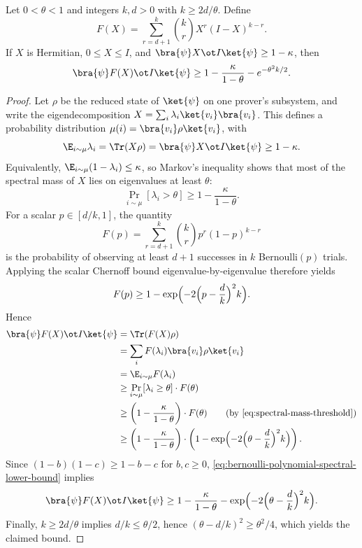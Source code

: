 \begin{lemma}\label{lem:chernoff-bernoulli-matrix}
	\leanok
	Let $0<\theta<1$ and integers $k,d>0$ with $k \ge 2d/\theta$. Define
	\[
		F(X) = \sum_{r=d+1}^k \binom{k}{r} X^r (I-X)^{k-r}.
	\]
	If $X$ is Hermitian, $0 \le X \le I$, and $\bra{\psi} X \ot I \ket{\psi} \ge 1-\kappa$, then
	\[
		\bra{\psi} F(X) \ot I \ket{\psi}
		\ge
		1 - \frac{\kappa}{1-\theta} - e^{-\theta^2 k/2}.
	\]
\end{lemma}
\begin{proof}
	\leanok
	Let $\rho$ be the reduced state of $\ket{\psi}$ on one prover's subsystem, and write the eigendecomposition $X = \sum_i \lambda_i \ket{v_i}\bra{v_i}$. This defines a probability distribution $\mu(i)=\bra{v_i}\rho\ket{v_i}$, with
	\[
		\E_{i\sim\mu} \lambda_i = \Tr(X\rho) = \bra{\psi} X \ot I \ket{\psi} \ge 1-\kappa.
	\]
	Equivalently, $\E_{i\sim\mu}(1-\lambda_i)\le \kappa$, so Markov's inequality
	shows that most of the spectral mass of $X$ lies on eigenvalues at least
	$\theta$:
	\begin{equation}\label{eq:spectral-mass-threshold}
		\Pr_{i\sim\mu}[\lambda_i > \theta] \ge 1-\frac{\kappa}{1-\theta}.
	\end{equation}
	For a scalar $p \in [d/k,1]$, the quantity
	\[
		F(p)=\sum_{r=d+1}^k \binom{k}{r}p^r(1-p)^{k-r}
	\]
	is the probability of observing at least $d+1$ successes in $k$
	Bernoulli$(p)$ trials. Applying the scalar Chernoff bound
	eigenvalue-by-eigenvalue therefore yields
	\begin{equation}\label{eq:bernoulli-tail-chernoff}
		F(p) \ge 1-\exp\Bigl(-2\Bigl(p-\frac{d}{k}\Bigr)^2k\Bigr).
	\end{equation}
	Hence
	\begin{align}
		\bra{\psi} F(X) \ot I \ket{\psi}
		 & = \Tr(F(X)\rho)\nonumber                                         \\
		 & = \sum_i F(\lambda_i)\bra{v_i}\rho\ket{v_i}\nonumber             \\
		 & = \E_{i\sim\mu} F(\lambda_i)\nonumber                            \\
		 & \ge \Pr_{i\sim\mu}[\lambda_i \ge \theta]\cdot F(\theta)\nonumber \\
		 & \ge \left(1-\frac{\kappa}{1-\theta}\right)\cdot F(\theta)
		\tag{by \ref{eq:spectral-mass-threshold}}\nonumber                           \\
		 & \ge \left(1-\frac{\kappa}{1-\theta}\right)\cdot
		\left(1-\exp\Bigl(-2\Bigl(\theta-\frac{d}{k}\Bigr)^2k\Bigr)\right).
		\label{eq:bernoulli-polynomial-spectral-lower-bound}
	\end{align}
	Since $(1-b)(1-c)\ge 1-b-c$ for $b,c\ge 0$, \ref{eq:bernoulli-polynomial-spectral-lower-bound} implies
	\[
		\bra{\psi} F(X) \ot I \ket{\psi}
		\ge
		1-\frac{\kappa}{1-\theta}
		- \exp\Bigl(-2\Bigl(\theta-\frac{d}{k}\Bigr)^2k\Bigr).
	\]
	Finally, $k \ge 2d/\theta$ implies $d/k \le \theta/2$, hence $(\theta-d/k)^2 \ge \theta^2/4$, which yields the claimed bound.
\end{proof}

